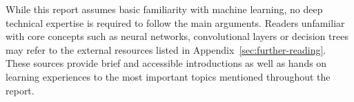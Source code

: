 While this report assumes basic familiarity with machine learning, no deep technical expertise is required to follow the main arguments. Readers unfamiliar with core concepts such 
as neural networks, convolutional layers or decision trees may refer to the external resources listed in Appendix~\ref{sec:further-reading}. 
These sources provide brief and accessible introductions as well as hands on learning experiences to the most important topics mentioned throughout the report.